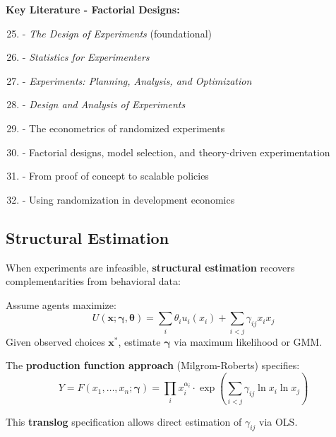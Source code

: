 \textbf{Key Literature - Factorial Designs:}
\begin{enumerate}[noitemsep]
    \setcounter{enumi}{24}
    \item \citet{fisher1935} - \textit{The Design of Experiments} (foundational)
    \item \citet{box1978} - \textit{Statistics for Experimenters}
    \item \citet{wu2009} - \textit{Experiments: Planning, Analysis, and Optimization}
    \item \citet{montgomery2017} - \textit{Design and Analysis of Experiments}
    \item \citet{athey2017} - The econometrics of randomized experiments
    \item \citet{muralidharan2017} - Factorial designs, model selection, and theory-driven experimentation
    \item \citet{banerjee2017} - From proof of concept to scalable policies
    \item \citet{duflo2007} - Using randomization in development economics
\end{enumerate}

\subsection{Structural Estimation}
\label{subsec:structural-estimation}

When experiments are infeasible, \textbf{structural estimation} recovers complementarities from behavioral data:

\begin{definition}
Assume agents maximize:
\begin{equation}
U(\mathbf{x}; \boldsymbol{\gamma}, \boldsymbol{\theta}) = \sum_i \theta_i u_i(x_i) + \sum_{i < j} \gamma_{ij} x_i x_j
\end{equation}
Given observed choices $\mathbf{x}^*$, estimate $\boldsymbol{\gamma}$ via maximum likelihood or GMM.
\end{definition}

The \textbf{production function approach} (Milgrom-Roberts) specifies:
\begin{equation}
Y = F(x_1, \ldots, x_n; \boldsymbol{\gamma}) = \prod_i x_i^{\alpha_i} \cdot \exp\left(\sum_{i<j} \gamma_{ij} \ln x_i \ln x_j\right)
\label{eq:translog}
\end{equation}

This \textbf{translog} specification allows direct estimation of $\gamma_{ij}$ via OLS.

